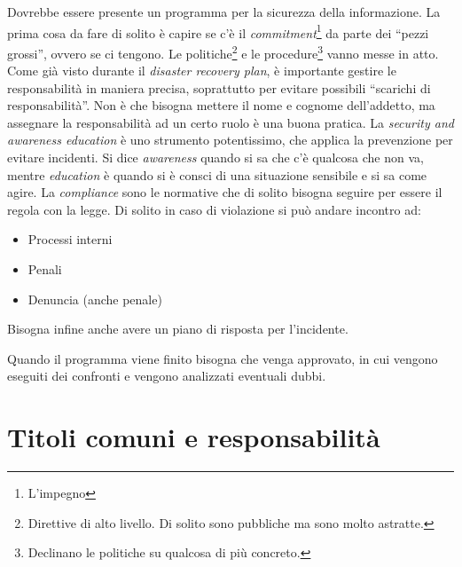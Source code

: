Dovrebbe essere presente un programma per la sicurezza della informazione. La
prima cosa da fare di solito è capire se c'è il
\textit{commitment}\footnote{L'impegno} da parte dei ``pezzi grossi'', ovvero
se ci tengono. Le politiche\footnote{Direttive di alto livello. Di solito sono
pubbliche ma sono molto astratte.} e le procedure\footnote{Declinano le
politiche su qualcosa di più concreto.} vanno messe in atto. Come già visto
durante il \textit{disaster recovery plan}, è importante gestire le
responsabilità in maniera precisa, soprattutto per evitare possibili ``scarichi
di responsabilità''. Non è che bisogna mettere il nome e cognome dell'addetto,
ma assegnare la responsabilità ad un certo ruolo è una buona pratica. La
\textit{security and awareness education} è uno strumento potentissimo, che
applica la prevenzione per evitare incidenti. Si dice \textit{awareness} quando
si sa che c'è qualcosa che non va, mentre \textit{education} è quando si è
consci di una situazione sensibile e si sa come agire.
La \textit{compliance} sono le normative che di solito bisogna seguire per
essere il regola con la legge. Di solito in caso di violazione si può andare
incontro ad:
\begin{itemize}
  \item Processi interni
  \item Penali
  \item Denuncia (anche penale)
\end{itemize}
Bisogna infine anche avere un piano di risposta per l'incidente.

Quando il programma viene finito bisogna che venga approvato, in cui vengono
eseguiti dei confronti e vengono analizzati eventuali dubbi.

\section{Titoli comuni e responsabilità}


